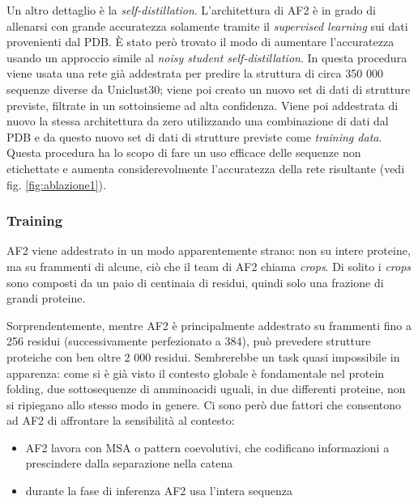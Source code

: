 \par Un altro dettaglio è la \textit{self-distillation}. L'architettura di AF2 è in grado di allenarsi con grande accuratezza solamente tramite il \textit{supervised learning} sui dati provenienti dal PDB. È stato però trovato il modo di aumentare l'accuratezza usando un approccio simile al \textit{noisy student self-distillation}\supercite{xie2020self}. In questa procedura viene usata una rete già addestrata per predire la struttura di circa 350 000 sequenze diverse da Uniclust30; viene poi creato un nuovo set di dati di strutture previste, filtrate in un sottoinsieme ad alta confidenza. Viene poi addestrata di nuovo la stessa architettura da zero utilizzando una combinazione di dati dal PDB e da questo nuovo set di dati di strutture previste come \textit{training data}. Questa procedura ha lo scopo di fare un uso efficace delle sequenze non etichettate e aumenta considerevolmente l'accuratezza della rete risultante (vedi fig. \ref{fig:ablazione1}). 

\subsubsection{Training}

AF2 viene addestrato in un modo apparentemente strano: non su intere proteine, ma su frammenti di alcune, ciò che il team di AF2 chiama \textit{crops}. Di solito i \textit{crops} sono composti da un paio di centinaia di residui, quindi solo una frazione di grandi proteine.

\par Sorprendentemente, mentre AF2 è principalmente addestrato su frammenti fino a 256 residui (successivamente perfezionato a 384), può prevedere strutture proteiche con ben oltre 2 000 residui. Sembrerebbe un task quasi impossibile in apparenza: come si è già visto il contesto globale è fondamentale nel protein folding, due sottosequenze di amminoacidi uguali, in due differenti proteine, non si ripiegano allo stesso modo in genere. Ci sono però due fattori che consentono ad AF2 di affrontare la sensibilità al contesto:

\begin{itemize}
	\item AF2 lavora con MSA o pattern coevolutivi, che codificano informazioni a prescindere dalla separazione nella catena
	\item durante la fase di inferenza AF2 usa l'intera sequenza
\end{itemize}

